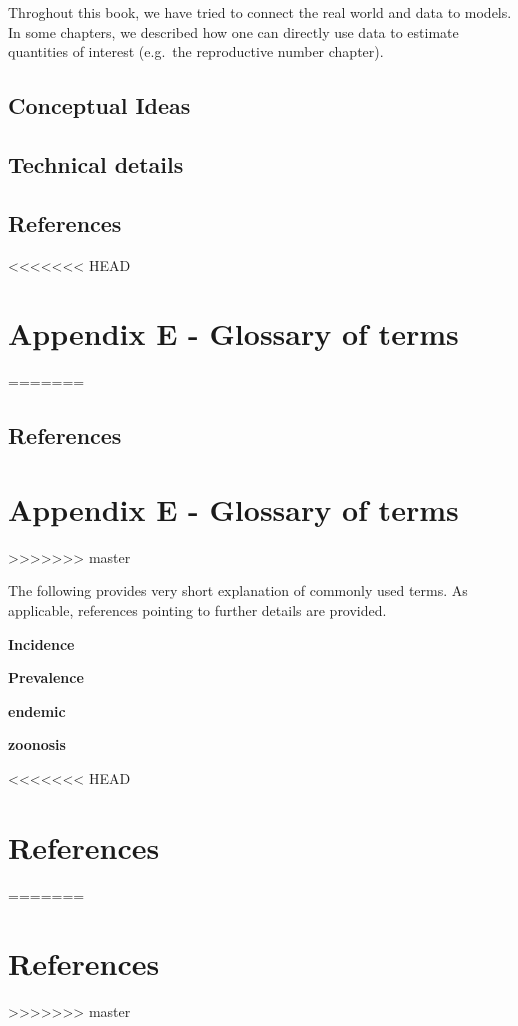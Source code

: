 \documentclass[]{book}
\theoremstyle{definition}
\theoremstyle{definition}
\theoremstyle{definition}
\theoremstyle{remark}
\begin{document}
Throghout this book, we have tried to connect the real world and data to
models. In some chapters, we described how one can directly use data to
estimate quantities of interest (e.g.~the reproductive number chapter).

\hypertarget{conceptual-ideas}{%
\section{Conceptual Ideas}\label{conceptual-ideas}}

\hypertarget{technical-details}{%
\section{Technical details}\label{technical-details}}

\hypertarget{references-3}{%
\section{References}\label{references-3}}

<<<<<<< HEAD
\hypertarget{glossary}{%
\chapter{Appendix E - Glossary of terms}\label{glossary}}
=======
\section{References}\label{references-22}

\chapter{Appendix E - Glossary of terms}\label{glossary}
>>>>>>> master

The following provides very short explanation of commonly used terms. As
applicable, references pointing to further details are provided.

\textbf{Incidence}

\textbf{Prevalence}

\textbf{endemic}

\textbf{zoonosis}

<<<<<<< HEAD
\hypertarget{references}{%
\chapter{References}\label{references}}
=======
\chapter{References}\label{references}
>>>>>>> master
\end{document}
